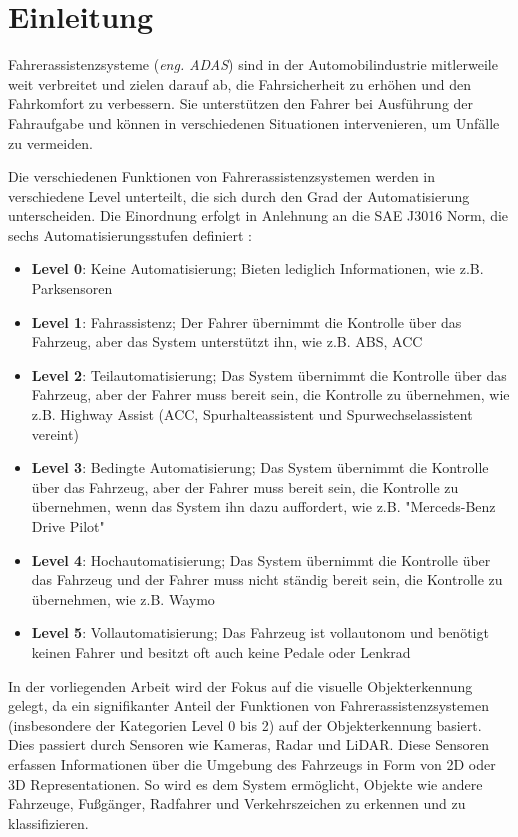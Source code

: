 \section{Einleitung} \label{sec:einleitung}

Fahrerassistenzsysteme (\textit{eng. \ac{ADAS}}) sind in der Automobilindustrie mitlerweile weit verbreitet und zielen darauf ab, die Fahrsicherheit zu erhöhen und den Fahrkomfort zu verbessern. Sie unterstützen den Fahrer bei Ausführung der Fahraufgabe und können in verschiedenen Situationen intervenieren, um Unfälle zu vermeiden. \cite{HistoryAndFutureADAS}

Die verschiedenen Funktionen von Fahrerassistenzsystemen werden in verschiedene Level unterteilt, die sich durch den Grad der Automatisierung unterscheiden. Die Einordnung erfolgt in Anlehnung an die SAE J3016 Norm, die sechs Automatisierungsstufen definiert \cite{HistoryAndFutureADAS}:
\begin{itemize}
    \item \textbf{Level 0}: Keine Automatisierung; Bieten lediglich Informationen, wie z.B. Parksensoren
    \item \textbf{Level 1}: Fahrassistenz; Der Fahrer übernimmt die Kontrolle über das Fahrzeug, aber das System unterstützt ihn, wie z.B. \ac{ABS}, \ac{ACC}
    \item \textbf{Level 2}: Teilautomatisierung; Das System übernimmt die Kontrolle über das Fahrzeug, aber der Fahrer muss bereit sein, die Kontrolle zu übernehmen, wie z.B. Highway Assist (\ac{ACC}, Spurhalteassistent und Spurwechselassistent vereint) 
    \item \textbf{Level 3}: Bedingte Automatisierung; Das System übernimmt die Kontrolle über das Fahrzeug, aber der Fahrer muss bereit sein, die Kontrolle zu übernehmen, wenn das System ihn dazu auffordert, wie z.B. "Merceds-Benz Drive Pilot" \cite{mbdrivepilot}
    \item \textbf{Level 4}: Hochautomatisierung; Das System übernimmt die Kontrolle über das Fahrzeug und der Fahrer muss nicht ständig bereit sein, die Kontrolle zu übernehmen, wie z.B. Waymo \cite{Waymo}
    \item \textbf{Level 5}: Vollautomatisierung; Das Fahrzeug ist vollautonom und benötigt keinen Fahrer und besitzt oft auch keine Pedale oder Lenkrad
\end{itemize}

In der vorliegenden Arbeit wird der Fokus auf die visuelle Objekterkennung gelegt, da ein signifikanter Anteil der Funktionen von Fahrerassistenzsystemen (insbesondere der Kategorien Level 0 bis 2) auf der Objekterkennung basiert. Dies passiert durch Sensoren wie Kameras, Radar und LiDAR. Diese Sensoren erfassen Informationen über die Umgebung des Fahrzeugs in Form von 2D oder 3D Representationen. So wird es dem System ermöglicht, Objekte wie andere Fahrzeuge, Fußgänger, Radfahrer und Verkehrszeichen zu erkennen und zu klassifizieren. \cite{HistoryAndFutureADAS}
